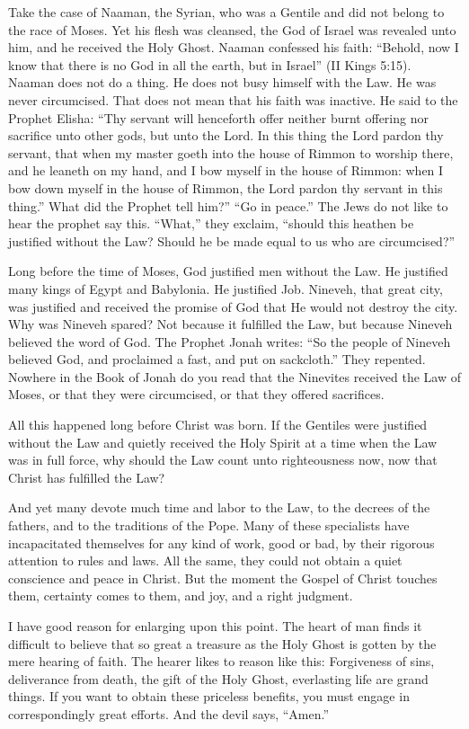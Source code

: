 Take the case of Naaman, the Syrian, who was a Gentile and did not belong to the race of Moses. Yet his flesh was cleansed, the God of Israel was revealed unto him, and he received the Holy Ghost. Naaman confessed his faith: “Behold, now I know that there is no God in all the earth, but in Israel” (II Kings 5:15). Naaman does not do a thing. He does not busy himself with the Law. He was never circumcised. That does not mean that his faith was inactive. He said to the Prophet Elisha: “Thy servant will henceforth offer neither burnt offering nor sacrifice unto other gods, but unto the Lord. In this thing the Lord pardon thy servant, that when my master goeth into the house of Rimmon to worship there, and he leaneth on my hand, and I bow myself in the house of Rimmon: when I bow down myself in the house of Rimmon, the Lord pardon thy servant in this thing.” What did the Prophet tell him?” “Go in peace.” The Jews do not like to hear the prophet say this. “What,” they exclaim, “should this heathen be justified without the Law? Should he be made equal to us who are circumcised?”

Long before the time of Moses, God justified men without the Law. He justified many kings of Egypt and Babylonia. He justified Job. Nineveh, that great city, was justified and received the promise of God that He would not destroy the city. Why was Nineveh spared? Not because it fulfilled the Law, but because Nineveh believed the word of God. The Prophet Jonah writes: “So the people of Nineveh believed God, and proclaimed a fast, and put on sackcloth.” They repented. Nowhere in the Book of Jonah do you read that the Ninevites received the Law of Moses, or that they were circumcised, or that they offered sacrifices.

All this happened long before Christ was born. If the Gentiles were justified without the Law and quietly received the Holy Spirit at a time when the Law was in full force, why should the Law count unto righteousness now, now that Christ has fulfilled the Law?

And yet many devote much time and labor to the Law, to the decrees of the fathers, and to the traditions of the Pope. Many of these specialists have incapacitated themselves for any kind of work, good or bad, by their rigorous attention to rules and laws. All the same, they could not obtain a quiet conscience and peace in Christ. But the moment the Gospel of Christ touches them, certainty comes to them, and joy, and a right judgment.

I have good reason for enlarging upon this point. The heart of man finds it difficult to believe that so great a treasure as the Holy Ghost is gotten by the mere hearing of faith. The hearer likes to reason like this: Forgiveness of sins, deliverance from death, the gift of the Holy Ghost, everlasting life are grand things. If you want to obtain these priceless benefits, you must engage in correspondingly great efforts. And the devil says, “Amen.”

